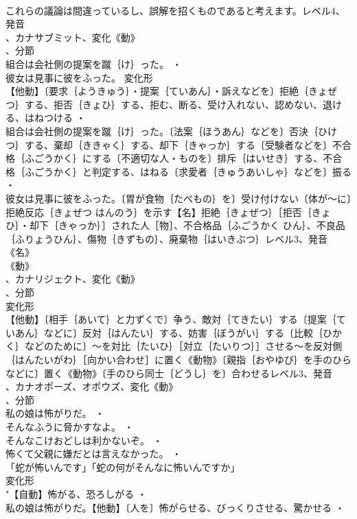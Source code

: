 \documentclass[8pt]{extreport}
\begin{document}
\begin{CJK}{UTF8}{min}
\\	これらの議論は間違っているし、誤解を招くものであると考えます。レベル4、発音
\\	、カナサブミット、変化《動》
\\	、分節
\\	組合は会社側の提案を蹴｛け｝った。 ・
\\	彼女は見事に彼をふった。	変化形 
\\	【他動】〔要求｛ようきゅう｝・提案｛ていあん｝・訴えなどを〕拒絶｛きょぜつ｝する、拒否｛きょひ｝する、拒む、断る、受け入れない、認めない、退ける、はねつける ・
\\	組合は会社側の提案を蹴｛け｝った。〔法案｛ほうあん｝などを〕否決｛ひけつ｝する、棄却｛ききゃく｝する、却下｛きゃっか｝する〔受験者などを〕不合格｛ふごうかく｝にする〔不適切な人・ものを〕排斥｛はいせき｝する、不合格｛ふごうかく｝と判定する、はねる〔求愛者｛きゅうあいしゃ｝などを〕振る ・
\\	彼女は見事に彼をふった。〔胃が食物｛たべもの｝を〕受け付けない〔体が～に〕拒絶反応｛きょぜつ はんのう｝を示す【名】拒絶｛きょぜつ｝［拒否｛きょひ｝・却下｛きゃっか｝］された人［物］、不合格品｛ふごうかく ひん｝、不良品｛ふりょうひん｝、傷物｛きずもの｝、廃棄物｛はいきぶつ｝レベル3、発音《名》
\\	《動》
\\	、カナリジェクト、変化《動》
\\	、分節
\\	変化形 
\\	【他動】〔相手｛あいて｝と力ずくで〕争う、敵対｛てきたい｝する〔提案｛ていあん｝などに〕反対｛はんたい｝する、妨害｛ぼうがい｝する〔比較｛ひかく｝などのために〕～を対比｛たいひ｝［対立｛たいりつ｝］させる～を反対側｛はんたいがわ｝［向かい合わせ］に置く《動物》〔親指｛おやゆび｝を手のひらなどに〕置く《動物》〔手のひら同士｛どうし｝を〕合わせるレベル3、発音
\\	、カナオポーズ、オポウズ、変化《動》
\\	、分節
\\	私の娘は怖がりだ。 ・
\\	そんなふうに脅かすなよ。 ・
\\	そんなこけおどしは利かないぞ。 ・
\\	怖くて父親に嫌だとは言えなかった。 ・
\\	「蛇が怖いんです」「蛇の何がそんなに怖いんですか」
\\	変化形 
\\	"【自動】怖がる、恐ろしがる ・
\\	私の娘は怖がりだ。【他動】〔人を〕怖がらせる、びっくりさせる、驚かせる ・

\end{CJK}
\end{document}
